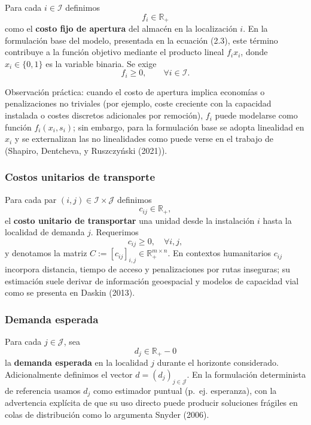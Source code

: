 \documentclass[
  spanish,
  us-letterpaper,
  DIV=11,
  numbers=noendperiod]{scrreprt}
\numberwithin{equation}{section}
\begin{document}
Para cada \(i\in\mathcal{I}\) definimos \[
f_i \in \mathbb{R}_{+}
\] como el \textbf{costo fijo de apertura} del almacén en la
localización \(i\). En la formulación base del modelo, presentada en la
ecuación (2.3), este término contribuye a la función objetivo mediante
el producto lineal \(f_i x_i\), donde \(x_i \in \{0,1\}\) es la variable
binaria. Se exige\\
\[
f_i \ge 0, \qquad \forall i \in \mathcal{I}.
\]

Observación práctica: cuando el costo de apertura implica economías o
penalizaciones no triviales (por ejemplo, coste creciente con la
capacidad instalada o costes discretos adicionales por remoción),
\(f_i\) puede modelarse como función \(f_i(x_i,s_i)\); sin embargo, para
la formulación base se adopta linealidad en \(x_i\) y se externalizan
las no linealidades como puede verse en el trabajo de (Shapiro,
Dentcheva, y Ruszczyński (2021)).

\subsubsection{Costos unitarios de
transporte}\label{costos-unitarios-de-transporte}

Para cada par \((i,j)\in\mathcal{I}\times\mathcal{J}\) definimos \[
c_{ij}\in\mathbb{R}_{+},
\] el \textbf{costo unitario de transportar} una unidad desde la
instalación \(i\) hasta la localidad de demanda \(j\). Requerimos \[
c_{ij}\ge 0,\quad \forall i,j,
\] y denotamos la matriz
\(C:=[c_{ij}]_{i,j}\in\mathbb{R}_+^{m\times n}\). En contextos
humanitarios \(c_{ij}\) incorpora distancia, tiempo de acceso y
penalizaciones por rutas inseguras; su estimación suele derivar de
información geoespacial y modelos de capacidad vial como se presenta en
Daskin (2013).

\subsubsection{Demanda esperada}\label{demanda-esperada}

Para cada \(j\in\mathcal{J}\), sea \[
d_j\in\mathbb{R}_{+}-{0}
\] la \textbf{demanda esperada} en la localidad \(j\) durante el
horizonte considerado. Adicionalmente definimos el vector
\(d=(d_j)_{j\in\mathcal{J}}\). En la formulación determinista de
referencia usamos \(d_j\) como estimador puntual (p.~ej. esperanza), con
la advertencia explícita de que su uso directo puede producir soluciones
frágiles en colas de distribución como lo argumenta Snyder (2006).
\end{document}
